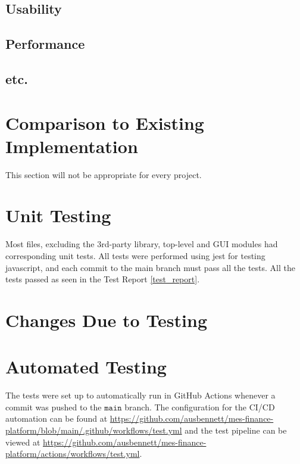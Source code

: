 \documentclass[12pt, titlepage]{article}
\begin{document}
\subsection{Usability}
		
\subsection{Performance}

\subsection{etc.}
	
\section{Comparison to Existing Implementation}	

This section will not be appropriate for every project.

\section{Unit Testing}

Most files, excluding the 3rd-party library, top-level and GUI modules had corresponding unit tests.
All tests were performed using jest for testing javascript, and each commit to the main branch must pass all the tests.
All the tests passed as seen in the Test Report \ref{test_report}.

\section{Changes Due to Testing}


\section{Automated Testing}

The tests were set up to automatically run in GitHub Actions whenever a commit was pushed to the $\mathtt{main}$ branch.
The configuration for the CI/CD automation can be found at \url{https://github.com/ausbennett/mes-finance-platform/blob/main/.github/workflows/test.yml}
and the test pipeline can be viewed at \url{https://github.com/ausbennett/mes-finance-platform/actions/workflows/test.yml}.
		
\end{document}
